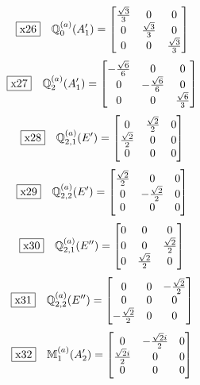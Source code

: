 \documentclass[fleqn,10pt,landscape]{jsarticle}
\begin{document}
\begin{dmath*}
\fbox{x26}\quad \mathbb{Q}_{0}^{(a)}(A_{1}^{\prime})=\begin{bmatrix} \frac{\sqrt{3}}{3} & 0 & 0 \\ 0 & \frac{\sqrt{3}}{3} & 0 \\ 0 & 0 & \frac{\sqrt{3}}{3} \end{bmatrix}
\end{dmath*}
\begin{dmath*}
\fbox{x27}\quad \mathbb{Q}_{2}^{(a)}(A_{1}^{\prime})=\begin{bmatrix} - \frac{\sqrt{6}}{6} & 0 & 0 \\ 0 & - \frac{\sqrt{6}}{6} & 0 \\ 0 & 0 & \frac{\sqrt{6}}{3} \end{bmatrix}
\end{dmath*}
\begin{dmath*}
\fbox{x28}\quad \mathbb{Q}_{2,1}^{(a)}(E^{\prime})=\begin{bmatrix} 0 & \frac{\sqrt{2}}{2} & 0 \\ \frac{\sqrt{2}}{2} & 0 & 0 \\ 0 & 0 & 0 \end{bmatrix}
\end{dmath*}
\begin{dmath*}
\fbox{x29}\quad \mathbb{Q}_{2,2}^{(a)}(E^{\prime})=\begin{bmatrix} \frac{\sqrt{2}}{2} & 0 & 0 \\ 0 & - \frac{\sqrt{2}}{2} & 0 \\ 0 & 0 & 0 \end{bmatrix}
\end{dmath*}
\begin{dmath*}
\fbox{x30}\quad \mathbb{Q}_{2,1}^{(a)}(E^{\prime\prime})=\begin{bmatrix} 0 & 0 & 0 \\ 0 & 0 & \frac{\sqrt{2}}{2} \\ 0 & \frac{\sqrt{2}}{2} & 0 \end{bmatrix}
\end{dmath*}
\begin{dmath*}
\fbox{x31}\quad \mathbb{Q}_{2,2}^{(a)}(E^{\prime\prime})=\begin{bmatrix} 0 & 0 & - \frac{\sqrt{2}}{2} \\ 0 & 0 & 0 \\ - \frac{\sqrt{2}}{2} & 0 & 0 \end{bmatrix}
\end{dmath*}
\begin{dmath*}
\fbox{x32}\quad \mathbb{M}_{1}^{(a)}(A_{2}^{\prime})=\begin{bmatrix} 0 & - \frac{\sqrt{2} i}{2} & 0 \\ \frac{\sqrt{2} i}{2} & 0 & 0 \\ 0 & 0 & 0 \end{bmatrix}
\end{dmath*}
\end{document}
